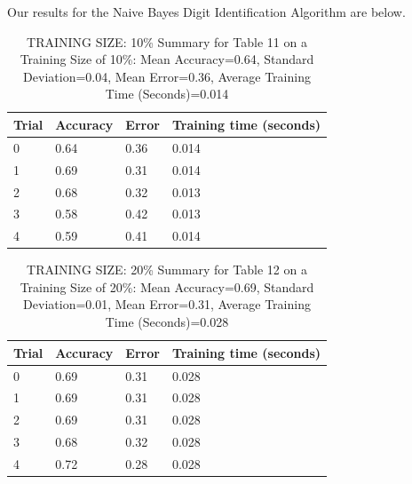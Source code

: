 \documentclass{article}
\begin{document}
Our results for the Naive Bayes Digit Identification Algorithm are below.

\begin{table}[H]

\centering
{\begin{tabular}{||p{1cm}|p{1.8cm}|p{1.8cm}|p{3cm}||}
 \hline
Trial & Accuracy & Error & Training time (seconds) \\ [0.5ex] 
 \hline\hline
   0  & 0.64  & 0.36  & 0.014\\
\hline
   1  & 0.69  & 0.31  & 0.014\\
\hline
   2  & 0.68  & 0.32  & 0.013\\
\hline
   3  & 0.58  & 0.42  & 0.013\\
\hline
   4  & 0.59  & 0.41  & 0.014\\
\hline

\end{tabular}}
\caption{TRAINING SIZE: 10\% \newline Summary for Table 11 on a Training Size of 10\%: Mean Accuracy=0.64, Standard Deviation=0.04, Mean Error=0.36, Average Training Time (Seconds)=0.014}
\end{table} 

\begin{table}[H]

\centering
{\begin{tabular}{||p{1cm}|p{1.8cm}|p{1.8cm}|p{3cm}||}
 \hline
Trial & Accuracy & Error & Training time (seconds) \\ [0.5ex] 
 \hline\hline
   0  & 0.69  & 0.31  & 0.028\\
\hline
   1  & 0.69  & 0.31  & 0.028\\
\hline
   2  & 0.69  & 0.31  & 0.028\\
\hline
   3  & 0.68  & 0.32  & 0.028\\
\hline
   4  & 0.72  & 0.28  & 0.028\\
\hline

\end{tabular}}
\caption{TRAINING SIZE: 20\% \newline Summary for Table 12 on a Training Size of 20\%: Mean Accuracy=0.69, Standard Deviation=0.01, Mean Error=0.31, Average Training Time (Seconds)=0.028}
\end{table} 
\end{document}
